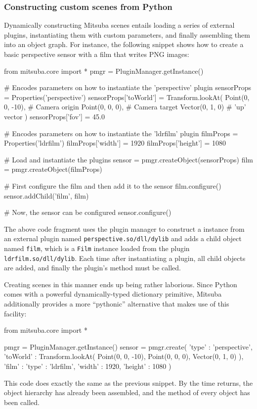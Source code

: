 \subsubsection{Constructing custom scenes from Python}
Dynamically constructing Mitsuba scenes entails loading a series of external 
plugins, instantiating them with custom parameters, and finally assembling 
them into an object graph. 
For instance, the following snippet shows how to create a basic
perspective sensor with a film that writes PNG images:
\begin{python}
from mitsuba.core import *
pmgr = PluginManager.getInstance()

# Encodes parameters on how to instantiate the 'perspective' plugin
sensorProps = Properties('perspective')
sensorProps['toWorld'] = Transform.lookAt(
	Point(0, 0, -10),  # Camera origin
	Point(0, 0, 0),    # Camera target
	Vector(0, 1, 0)    # 'up' vector
)
sensorProps['fov'] = 45.0

# Encodes parameters on how to instantiate the 'ldrfilm' plugin
filmProps = Properties('ldrfilm')
filmProps['width'] = 1920
filmProps['height'] = 1080

# Load and instantiate the plugins
sensor = pmgr.createObject(sensorProps)
film = pmgr.createObject(filmProps)

# First configure the film and then add it to the sensor
film.configure()
sensor.addChild('film', film)

# Now, the sensor can be configured
sensor.configure()
\end{python}
The above code fragment uses the plugin manager to construct a 
 instance from an external plugin named 
\texttt{perspective.so/dll/dylib} and adds a child object
named \texttt{film}, which is a \texttt{Film} instance loaded from the
plugin \texttt{ldrfilm.so/dll/dylib}.
Each time after instantiating a plugin, all child objects are added, and
finally the  plugin's  method must be called.

Creating scenes in this manner ends up being rather laborious.
Since Python comes with a powerful dynamically-typed dictionary
primitive, Mitsuba additionally provides a more ``pythonic'' 
alternative that makes use of this facility:
\begin{python}
from mitsuba.core import *

pmgr = PluginManager.getInstance()
sensor = pmgr.create({
	'type' : 'perspective',
	'toWorld' : Transform.lookAt(
		Point(0, 0, -10),
		Point(0, 0, 0),
		Vector(0, 1, 0)
	),
	'film' : {
		'type' : 'ldrfilm',
		'width' : 1920,
		'height' : 1080
	}
})
\end{python}
This code does exactly the same as the previous snippet.
By the time  returns, the object
hierarchy has already been assembled, and the 
 method of every object
has been called.

